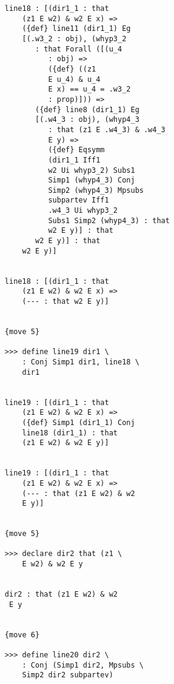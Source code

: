 \documentclass[12pt]{article}
\begin{document}
\begin{verbatim}
                  line18 : [(dir1_1 : that 
                      (z1 E w2) & w2 E x) => 
                      ({def} line11 (dir1_1) Eg 
                      [(.w3_2 : obj), (whyp3_2 
                         : that Forall ([(u_4 
                            : obj) => 
                            ({def} ((z1 
                            E u_4) & u_4 
                            E x) == u_4 = .w3_2 
                            : prop)])) => 
                         ({def} line8 (dir1_1) Eg 
                         [(.w4_3 : obj), (whyp4_3 
                            : that (z1 E .w4_3) & .w4_3 
                            E y) => 
                            ({def} Eqsymm 
                            (dir1_1 Iff1 
                            w2 Ui whyp3_2) Subs1 
                            Simp1 (whyp4_3) Conj 
                            Simp2 (whyp4_3) Mpsubs 
                            subpartev Iff1 
                            .w4_3 Ui whyp3_2 
                            Subs1 Simp2 (whyp4_3) : that 
                            w2 E y)] : that 
                         w2 E y)] : that 
                      w2 E y)]


                  line18 : [(dir1_1 : that 
                      (z1 E w2) & w2 E x) => 
                      (--- : that w2 E y)]


                  {move 5}

                  >>> define line19 dir1 \
                      : Conj Simp1 dir1, line18 \
                      dir1


                  line19 : [(dir1_1 : that 
                      (z1 E w2) & w2 E x) => 
                      ({def} Simp1 (dir1_1) Conj 
                      line18 (dir1_1) : that 
                      (z1 E w2) & w2 E y)]


                  line19 : [(dir1_1 : that 
                      (z1 E w2) & w2 E x) => 
                      (--- : that (z1 E w2) & w2 
                      E y)]


                  {move 5}

                  >>> declare dir2 that (z1 \
                      E w2) & w2 E y


                  dir2 : that (z1 E w2) & w2 
                   E y


                  {move 6}

                  >>> define line20 dir2 \
                      : Conj (Simp1 dir2, Mpsubs \
                      Simp2 dir2 subpartev)



\end{verbatim}
\end{document}
